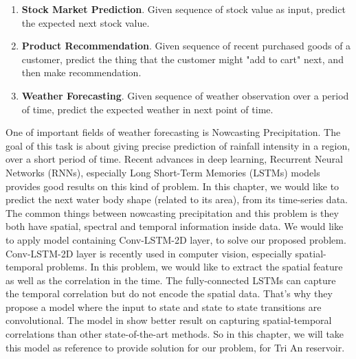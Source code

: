 \begin{enumerate}
	\item \textbf{Stock Market Prediction}\cite{Pagolu2016,Liu2018}. Given sequence of stock value as input, predict the expected next stock value. 
	
	\item \textbf{Product Recommendation}\cite{Wang2018,Cao2019}. Given sequence of recent purchased goods of a customer, predict the thing that the customer might "add to cart" next, and then make recommendation. 
	
	\item \textbf{Weather Forecasting}\cite{Quan2000,Wang2017}. Given sequence of weather observation over a period of time, predict the expected weather in next point of time.
	
\end{enumerate}


One of important fields of weather forecasting is Nowcasting Precipitation\cite{Sun2013}. The goal of this task is about giving precise prediction of rainfall intensity in a region, over a short period of time. Recent advances in deep learning, Recurrent Neural Networks (RNNs), especially Long Short-Term Memories (LSTMs) models\cite{Graves2013GeneratingSW,Hochreiter1997,Cho2014,Donahue2017} provides good results on this kind of problem. In this chapter, we would like to predict the next water body shape (related to its area), from its time-series data. The common things between nowcasting precipitation and this problem is they both have spatial, spectral and temporal information inside data. We would like to apply model containing Conv-LSTM-2D layer\cite{Shi2015ConvolutionalLN}, to solve our proposed problem. Conv-LSTM-2D layer is recently used in computer vision, especially spatial-temporal problems. In this problem, we would like to extract the spatial feature as well as the correlation in the time. The fully-connected LSTMs can capture the temporal correlation but do not encode the spatial data. That's why they propose a model where the input to state and state to state transitions are convolutional. The model in \cite{Shi2015ConvolutionalLN} show better result on capturing spatial-temporal correlations than other state-of-the-art methods. So in this chapter, we will take this model as reference to provide solution for our problem, for Tri An reservoir.

